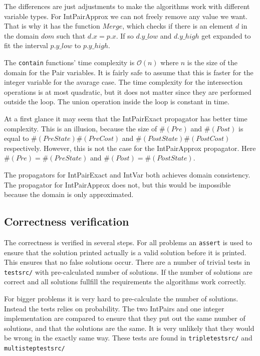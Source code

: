 \documentclass[a4paper,11pt]{article}
\begin{document}


The differences are just adjustments to make the algorithms work with different variable types. For IntPairApprox we can not freely remove any value we want. That is why it has the function $Merge$, which checks if there is an element $d$ in the domain $dom$ such that $d.x=p.x$. If so $d.y\_low$ and $d.y\_high$ get expanded to fit the interval $p.y\_low$ to $p.y\_high$. 

The \texttt{contain} functions' time complexity is $\mathcal{O}(n)$ where $n$ is the size of the domain for the Pair variables. It is fairly safe to assume that this is faster for the integer variable for the avarage case. The time complexity for the intersection operations is at most quadratic, but it does not matter since they are performed outside the loop. The union operation inside the loop is constant in time.

At a first glance it may seem that the IntPairExact propagator has better time complexity. This is an illusion, because the size of $\#(Pre)$ and $\#(Post)$ is equal to $\#(PreState)\#(PreCost)$ and $\#(PostState)\#(PostCost)$ respectively. However, this is not the case for the IntPairApprox propagator. Here $\#(Pre)=\#(PreState)$ and $\#(Post)=\#(PostState)$. 

The propagators for IntPairExact and IntVar both achieves domain consistency. The propagator for IntPairApprox does not, but this would be impossible because the domain is only approximated.

\subsection{Correctness verification}
The correctness is verified in several steps. For all problems an \texttt{assert} is used to ensure that the solution printed actually is a valid solution before it is printed. This ensures that no false solutions occur. There are a number of trivial tests in \texttt{testsrc/} with pre-calculated number of solutions. If the number of solutions are correct and all solutions fullfill the requirements the algorithms work correctly.

For bigger problems it is very hard to pre-calculate the number of solutions. Instead the tests relies on probability. The two IntPairs and one integer implementation are compared to ensure that they put out the same number of solutions, and that the solutions are the same. It is very unlikely that they would be wrong in the exactly same way. These tests are found in \texttt{tripletestsrc/} and \texttt{multisteptestsrc/}
\end{document}
